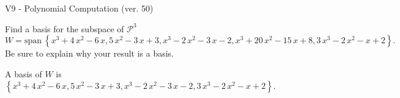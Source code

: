 \begin{exercise}
  \begin{exerciseTitle}V9 - Polynomial Computation (ver. 50)\end{exerciseTitle}
  \begin{exerciseStatement}
    Find a basis for the subspace of \(\mathcal{P}^3\) 
\[W=\mathrm{span}\ \left\{x^{3} + 4 \, x^{2} - 6 \, x , 5 \, x^{2} - 3 \, x + 3 , x^{3} - 2 \, x^{2} - 3 \, x - 2 , x^{3} + 20 \, x^{2} - 15 \, x + 8 , 3 \, x^{3} - 2 \, x^{2} - x + 2\right\}.\]
 Be sure to explain why your result is a basis.


  \end{exerciseStatement}
  \begin{exerciseAnswer}
   A basis of \(W\) is  \(\left\{x^{3} + 4 \, x^{2} - 6 \, x , 5 \, x^{2} - 3 \, x + 3 , x^{3} - 2 \, x^{2} - 3 \, x - 2 , 3 \, x^{3} - 2 \, x^{2} - x + 2\right\}\).
  


  \end{exerciseAnswer}
\end{exercise}
